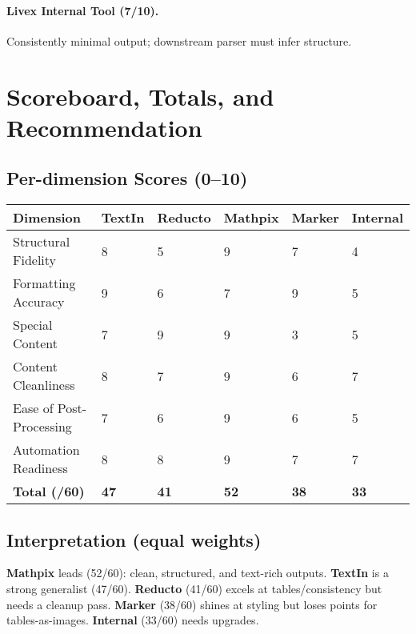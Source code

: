 \documentclass[11pt,a4paper]{article}
\begin{document}
\paragraph{Livex Internal Tool (7/10).}
Consistently minimal output; downstream parser must infer structure.

\section*{Scoreboard, Totals, and Recommendation}

\subsection*{Per-dimension Scores (0--10)}
\begin{center}
\small
\begin{longtable}{@{}P{0.22\textwidth}P{0.14\textwidth}P{0.14\textwidth}P{0.14\textwidth}P{0.14\textwidth}P{0.14\textwidth}@{}}
\toprule
\textbf{Dimension} & \textbf{TextIn} & \textbf{Reducto} & \textbf{Mathpix} & \textbf{Marker} & \textbf{Internal} \\
\midrule
Structural Fidelity & 8 & 5 & 9 & 7 & 4 \\
Formatting Accuracy & 9 & 6 & 7 & 9 & 5 \\
Special Content & 7 & 9 & 9 & 3 & 5 \\
Content Cleanliness & 8 & 7 & 9 & 6 & 7 \\
Ease of Post-Processing & 7 & 6 & 9 & 6 & 5 \\
Automation Readiness & 8 & 8 & 9 & 7 & 7 \\
\midrule
\textbf{Total (/60)} & \textbf{47} & \textbf{41} & \textbf{52} & \textbf{38} & \textbf{33} \\
\bottomrule
\end{longtable}
\end{center}

\subsection*{Interpretation (equal weights)}
\textbf{Mathpix} leads (52/60): clean, structured, and text-rich outputs. \textbf{TextIn} is a strong generalist (47/60). \textbf{Reducto} (41/60) excels at tables/consistency but needs a cleanup pass. \textbf{Marker} (38/60) shines at styling but loses points for tables-as-images. \textbf{Internal} (33/60) needs upgrades.
\end{document}
